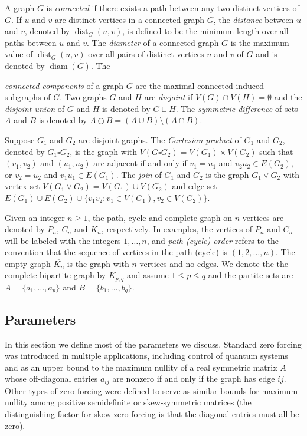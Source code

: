 \documentclass{article}
\numberwithin{figure}{section}
\numberwithin{table}{section}
\numberwithin{equation}{section}
\theoremstyle{definition}
\theoremstyle{definition}
\theoremstyle{definition}
\newcommand{\ol}{\overline}
\newcommand{\dist}{\operatorname{dist}}
\newcommand{\diam}{\operatorname{diam}}
\begin{document}
A graph $G$ is \emph{connected} if there exists a path between any two distinct vertices of $G$. If $u$ and $v$ are distinct vertices in a connected graph $G$, the \emph{distance} between $u$ and $v$, denoted by $\dist_G(u,v)$, is defined to be the minimum length %
 over all paths between $u$ and $v$. The \emph{diameter} of a connected graph $G$ is  the maximum value of $\dist_G(u,v)$ over all pairs of distinct vertices $u$ and $v$ of $G$   and is denoted by $\diam(G)$.  The {\emph{connected components} of a graph $G$ are {the  maximal} connected induced subgraphs of $G$. Two graphs $G$ and $H$ are \emph{disjoint} if $V(G)\cap V(H)=\emptyset$ and the \emph{disjoint union} of $G$ and $H$ is denoted by $G\sqcup H$.
 The  \textit{symmetric difference} of sets $A$ and $B$ is denoted by  $A
\ominus B=(A\cup B)\setminus (A\cap B)$.


Suppose $G_1$ and $G_2$ are disjoint graphs. The \emph{Cartesian product} of $G_1$ and $G_2$, denoted by $G_1\square G_2$, is the graph with $V(G\square  G_2)=V(G_1)\times V(G_2)$ such that $(v_1,v_2)$ and $(u_1,u_2)$ are adjacent if and only if  
  $v_1=u_1$ and $v_2u_2\in E(G_2)$, or
  $v_2=u_2$ and $v_1u_1\in E(G_1)$.
The \emph{join} of $G_1$ and $G_2$ is the graph $G_1 \vee G_2$ with vertex set $V(G_1 \vee G_2)=V(G_1) \cup V(G_2)$ and edge set $E(G_1) \cup E(G_2) \cup \{ v_1v_2:v_1 \in V(G_1), v_2 \in V(G_2)\}$.

Given an integer $n \geq 1$, the path, cycle and complete graph on $n$ vertices are denoted by $P_n$, $C_n$ and $K_n$, respectively. In examples, the vertices of $P_n$ and $C_n$ will be labeled  with the integers $1,\dots,n$, and  \emph{path (cycle) order} refers to the convention that the sequence of vertices in the path (cycle) is $(1,2,\dots,n)$.  The empty graph $\ol{K_n}$ is the graph with $n$ vertices and no edges.  
We denote the the complete bipartite graph by  $K_{p,q}$ and assume $1\le p\le q$ and the partite sets are $A=\{a_1,\dots,a_p\}$ and $B=\{b_1,\dots,b_q\}$.  

 




\subsection{Parameters}\label{ss:param}
 In this section we define most of the parameters we discuss.  
Standard zero forcing was introduced in multiple applications, including control of quantum systems and as an upper bound to the maximum nullity of a real symmetric matrix $A$ whose off-diagonal entries $a_{ij}$ are nonzero %
 if and only if the graph has edge $ij$.  Other types of zero forcing were defined to serve as similar bounds for maximum nullity among positive semidefinite or skew-symmetric matrices (the distinguishing factor for skew  zero forcing is that the diagonal entries must all be zero).   

}
\end{document}
